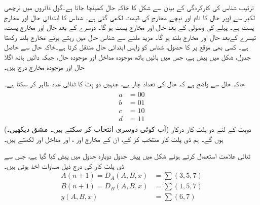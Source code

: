 \quad
ترتیب  شناس کی کارکردگی کے بیان سے شکل  کا   خاکہ حال   کھینچا  جاتا ہے۔گول دائروں میں ترچھی لکیر  سے  اوپر حال کا نام اور  نیچے مخارج کی قیمت  لکھی گئی ہے۔ شناس  کا ابتدائی      حال   اور  مخارج پست   ہے۔ پہلے  کی وصولی کے بعد  حال  اور  مخارج پست  ہو گا۔ دوسرے  کے بعد حال  اور مخارج پست، تیسرے   کےبعد حال  اور مخارج بلند ہو گا۔   مزید  ملنے سے شناس حال  میں رہتے ہوئے مخارج بلند رکھتا ہے۔ کسی بھی موقع پر   کا حصول، شناس  کو واپس ابتدائی حال  منتقل کرتا ہے۔خاکہ حال سے حاصل جدول،  شکل   میں پیش ہے، جس میں بائیں ہاتھ موجودہ مداخل اور موجودہ حال، جبکہ  دائیں ہاتھ اگلا حال اور موجودہ مخارج درج ہیں۔

خاکہ حال سے واضح  ہے کہ حال کی تعداد چار ہے، جنہیں دو بِٹ کا ثنائی عدد ظاہر کر سکتا ہے۔
\begin{gather}
\begin{aligned}\label{مساوات_ترتیبی_شناس_حال_انتخاب}
a&=00\\
b&=01\\
c&=10\\
d&=11
\end{aligned}
\end{gather}
(آپ کوئی دوسری  انتخاب کر سکتے ہیں۔ مشق  دیکھیں۔)  دوبِٹ کے لئے دو پلٹ کار درکار ہوں گے۔ ہم ڈی پلٹ کار منتخب کر کے،  ان کے مخارج  اور ، اور مداخل   اور   لکھتے  ہیں۔

ثنائی علامت استعمال کرتے ہوئے شکل   میں پیش جدول  دوبارہ جدول  میں پیش کیا گیا ہے، جس سے ڈی پلٹ کار کی درج ذیل مساوات اخذ ہوتی ہیں۔
\begin{align*}
A(n+1)=D_A(A,B,x)&=\sum(3,5,7)\\
B(n+1)=D_B(A,B,x)&=\sum(1,5,7)\\
y(A,B,x)&=\sum(6,7)
\end{align*}

